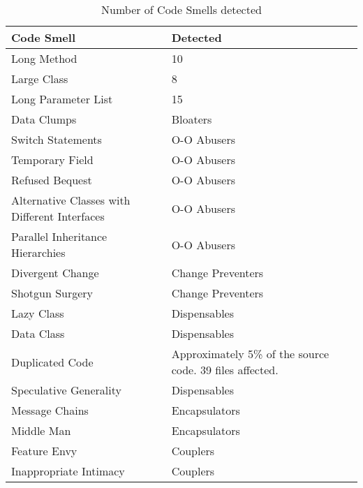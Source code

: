 \begin{table}[]
\centering
\caption{Number of Code Smells detected}
\label{tab:identifiedCodeSmell}
\begin{tabular}{|l|l|}
\hline
\textbf{Code Smell}                           & \textbf{Detected}    \\ \hline
Long Method                                   & 10          \\ \hline
Large Class                                   & 8          \\ \hline
Long Parameter List                           & 15          \\ \hline
Data Clumps                                   & Bloaters          \\ \hline
Switch Statements                             & O-O Abusers       \\ \hline
Temporary Field                               & O-O Abusers       \\ \hline
Refused Bequest                               & O-O Abusers       \\ \hline
Alternative Classes with Different Interfaces & O-O Abusers       \\ \hline
Parallel Inheritance Hierarchies              & O-O Abusers       \\ \hline
Divergent Change                              & Change Preventers \\ \hline
Shotgun Surgery                               & Change Preventers \\ \hline
Lazy Class                                    & Dispensables      \\ \hline
Data Class                                    & Dispensables      \\ \hline
Duplicated Code                               & Approximately 5\% of the source code. 39 files affected.       \\ \hline
Speculative Generality                        & Dispensables      \\ \hline
Message Chains                                & Encapsulators     \\ \hline
Middle Man                                    & Encapsulators     \\ \hline
Feature Envy                                  & Couplers          \\ \hline
Inappropriate Intimacy                        & Couplers          \\ \hline
\end{tabular}
\end{table}

